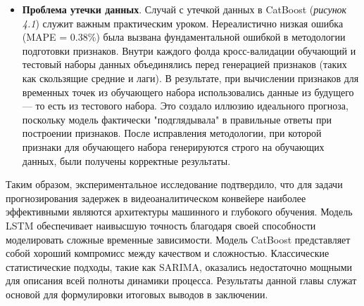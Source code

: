\begin{itemize}
    \item \textbf{Проблема утечки данных}. Случай с утечкой данных в CatBoost (\textit{рисунок 4.1}) служит важным практическим уроком. Нереалистично низкая ошибка (MAPE = 0.38\%) была вызвана фундаментальной ошибкой в методологии подготовки признаков. Внутри каждого фолда кросс-валидации обучающий и тестовый наборы данных объединялись перед генерацией признаков (таких как скользящие средние и лаги). В результате, при вычислении признаков для временных точек из обучающего набора использовались данные из будущего — то есть из тестового набора. Это создало иллюзию идеального прогноза, поскольку модель фактически "подглядывала" в правильные ответы при построении признаков. После исправления методологии, при которой признаки для обучающего набора генерируются строго на обучающих данных, были получены корректные результаты.
\end{itemize}

\hspace*{1.25cm}Таким образом, экспериментальное исследование подтвердило, что для задачи прогнозирования задержек в видеоаналитическом конвейере наиболее эффективными являются архитектуры машинного и глубокого обучения. Модель LSTM обеспечивает наивысшую точность благодаря своей способности моделировать сложные временные зависимости. Модель CatBoost представляет собой хороший компромисс между качеством и сложностью. Классические статистические подходы, такие как SARIMA, оказались недостаточно мощными для описания всей полноты динамики процесса. Результаты данной главы служат основой для формулировки итоговых выводов в заключении.
